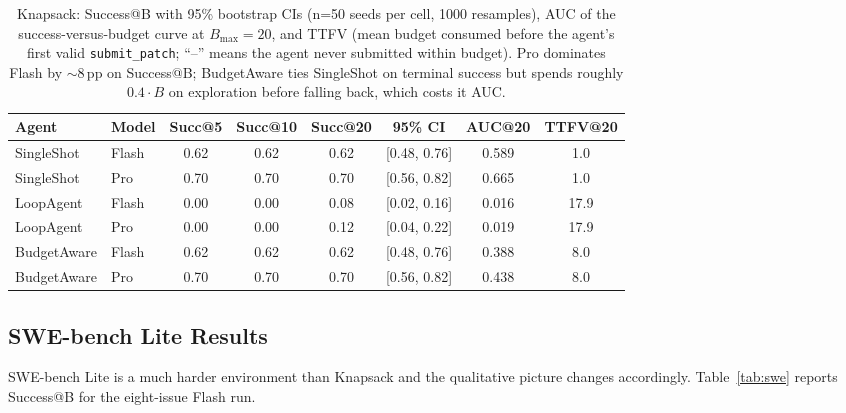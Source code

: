 \documentclass[11pt]{article}
\begin{document}
\begin{table}[t]
  \centering
  \caption{Knapsack: Success@B with 95\% bootstrap CIs (n=50 seeds per cell,
  1000 resamples), AUC of the success-versus-budget curve at $B_\text{max}=20$,
  and TTFV (mean budget consumed before the agent's first valid
  \texttt{submit\_patch}; ``--'' means the agent never submitted within budget).
  Pro dominates Flash by $\sim$8\,pp on Success@B; BudgetAware ties SingleShot
  on terminal success but spends roughly $0.4 \cdot B$ on exploration before
  falling back, which costs it AUC.}
  \label{tab:knapsack}
  \footnotesize
  \begin{tabular}{llcccccc}
    \toprule
    Agent & Model & Succ@5 & Succ@10 & Succ@20 & 95\% CI & AUC@20 & TTFV@20 \\
    \midrule
    SingleShot  & Flash & 0.62 & 0.62 & 0.62 & [0.48, 0.76] & 0.589 & 1.0 \\
    SingleShot  & Pro   & 0.70 & 0.70 & 0.70 & [0.56, 0.82] & 0.665 & 1.0 \\
    LoopAgent   & Flash & 0.00 & 0.00 & 0.08 & [0.02, 0.16] & 0.016 & 17.9 \\
    LoopAgent   & Pro   & 0.00 & 0.00 & 0.12 & [0.04, 0.22] & 0.019 & 17.9 \\
    BudgetAware & Flash & 0.62 & 0.62 & 0.62 & [0.48, 0.76] & 0.388 & 8.0 \\
    BudgetAware & Pro   & 0.70 & 0.70 & 0.70 & [0.56, 0.82] & 0.438 & 8.0 \\
    \bottomrule
  \end{tabular}
\end{table}

\subsection{SWE-bench Lite Results}
\label{sec:exp:swe}

SWE-bench Lite is a much harder environment than Knapsack and the
qualitative picture changes accordingly. Table~\ref{tab:swe} reports
Success@B for the eight-issue Flash run.
\end{document}
